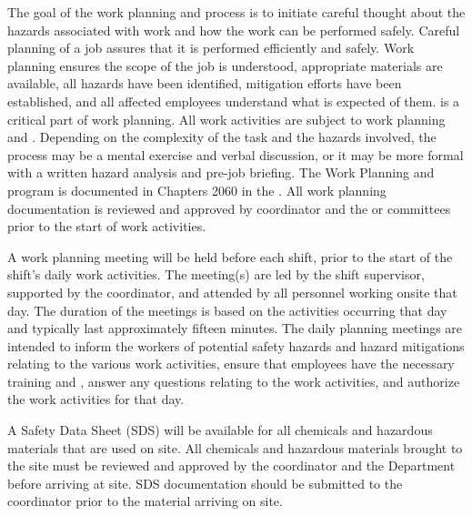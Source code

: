The goal of the work planning and  process is to
initiate careful thought about the hazards associated with work and
how the work can be performed safely. Careful planning of a job assures that
it is performed efficiently and safely. Work planning ensures the
scope of the job is understood, appropriate materials are available,
all hazards have been identified, mitigation efforts have been established, and
all affected employees understand what is expected of them. 
 is a critical part of work planning. All work activities
are subject to work planning and . Depending on
the complexity of the task and the hazards involved, the  process
may be a mental exercise and verbal discussion, or it may be more
formal with a written hazard analysis and pre-job briefing. The Work
Planning and  program is documented in Chapters 2060 in
the . All work planning documentation is reviewed and
approved by   coordinator and the 
 or  committees prior to the start of work activities.

A work planning meeting will be held %
before each shift, prior to the
start of the shift's daily work activities.  The meeting(s) %
are led by the
shift supervisor, supported by the   coordinator, and
attended by all personnel working onsite that day. The duration of
the meetings is based on the activities occurring that day and
typically last approximately fifteen minutes. The daily planning
meetings are intended to inform the workers of potential safety hazards and
hazard mitigations relating to the various work activities, ensure
that employees have the necessary  training and , answer any
questions relating to the work activities, and authorize the work
activities for that day.

A Safety Data Sheet (SDS) will be available for all chemicals and
hazardous materials that are used on site. All chemicals and hazardous
materials brought to the  site must be reviewed and approved by the
  coordinator and the  
Department before arriving at site.  SDS documentation should  be
submitted to the   coordinator prior to the
material arriving on site.

